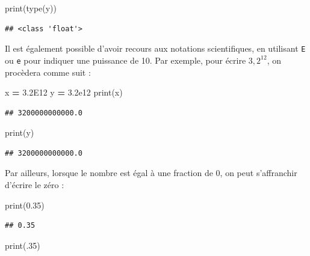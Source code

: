 \documentclass[12pt,]{book}
\newenvironment{Shaded}{\begin{snugshade}}{\end{snugshade}}
\newcommand{\DecValTok}[1]{\textcolor[rgb]{0.00,0.00,0.81}{#1}}
\newcommand{\FloatTok}[1]{\textcolor[rgb]{0.00,0.00,0.81}{#1}}
\newcommand{\OperatorTok}[1]{\textcolor[rgb]{0.81,0.36,0.00}{\textbf{#1}}}
\newcommand{\BuiltInTok}[1]{#1}
\newcommand{\NormalTok}[1]{#1}
\numberwithin{equation}{section}
\numberwithin{countremarque}{section}
\begin{document}
\begin{Shaded}
\begin{Highlighting}[]
\BuiltInTok{print}\NormalTok{(}\BuiltInTok{type}\NormalTok{(y))}
\end{Highlighting}
\end{Shaded}

\begin{lstlisting}
## <class 'float'>
\end{lstlisting}

Il est également possible d'avoir recours aux notations scientifiques,
en utilisant \texttt{E} ou \texttt{e} pour indiquer une puissance de 10.
Par exemple, pour écrire \(3,2^{12}\), on procèdera comme suit :

\begin{Shaded}
\begin{Highlighting}[]
\NormalTok{x }\OperatorTok{=} \FloatTok{3.2E12}
\NormalTok{y }\OperatorTok{=} \FloatTok{3.2e12}
\BuiltInTok{print}\NormalTok{(x)}
\end{Highlighting}
\end{Shaded}

\begin{lstlisting}
## 3200000000000.0
\end{lstlisting}

\begin{Shaded}
\begin{Highlighting}[]
\BuiltInTok{print}\NormalTok{(y)}
\end{Highlighting}
\end{Shaded}

\begin{lstlisting}
## 3200000000000.0
\end{lstlisting}

Par ailleurs, lorsque le nombre est égal à une fraction de 0, on peut
s'affranchir d'écrire le zéro :

\begin{Shaded}
\begin{Highlighting}[]
\BuiltInTok{print}\NormalTok{(}\FloatTok{0.35}\NormalTok{)}
\end{Highlighting}
\end{Shaded}

\begin{lstlisting}
## 0.35
\end{lstlisting}

\begin{Shaded}
\begin{Highlighting}[]
\BuiltInTok{print}\NormalTok{(.}\DecValTok{35}\NormalTok{)}
\end{Highlighting}
\end{Shaded}
\end{document}
